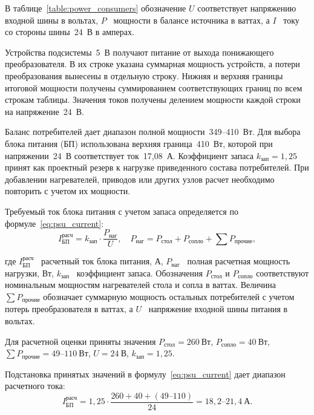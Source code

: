 В таблице~\ref{table:power_consumers} обозначение \(U\) соответствует напряжению входной шины в вольтах, \(P\)~\textemdash{} мощности в балансе источника в ваттах, а \(I\)~\textemdash{} току со стороны шины~24~В в амперах.

Устройства подсистемы~5~В получают питание от выхода понижающего преобразователя. В их строке указана суммарная мощность устройств, а потери преобразования вынесены в отдельную строку. Нижняя и верхняя границы итоговой мощности получены суммированием соответствующих границ по всем строкам таблицы. Значения токов получены делением мощности каждой строки на напряжение~24~В.

Баланс потребителей дает диапазон полной мощности~349--410~Вт. Для выбора блока питания (БП) использована верхняя граница~410~Вт, которой при напряжении~24~В соответствует ток~17,08~А. Коэффициент запаса \(k_{\text{зап}}=1{,}25\) принят как проектный резерв к нагрузке приведенного состава потребителей. При добавлении нагревателей, приводов или других узлов расчет необходимо повторить с учетом их мощности.

\begin{samepage}
Требуемый ток блока питания с учетом запаса определяется по формуле~\eqref{eq:psu_current}:
\begin{equation}
I_{\text{БП}}^{\text{расч}} =
k_{\text{зап}} \cdot \frac{P_{\text{наг}}}{U}, \quad
P_{\text{наг}} =
P_{\text{стол}} + P_{\text{сопло}} + \sum P_{\text{прочие}},
\label{eq:psu_current}
\end{equation}
\end{samepage}

\noindent где \(I_{\text{БП}}^{\text{расч}}\)~\textemdash{} расчетный ток блока питания, А, \(P_{\text{наг}}\)~\textemdash{} полная расчетная мощность нагрузки, Вт, \(k_{\text{зап}}\)~\textemdash{} коэффициент запаса. Обозначения \(P_{\text{стол}}\) и \(P_{\text{сопло}}\) соответствуют номинальным мощностям нагревателей стола и сопла в ваттах. Величина \(\sum P_{\text{прочие}}\) обозначает суммарную мощность остальных потребителей с учетом потерь преобразователя в ваттах, а \(U\)~\textemdash{} напряжение входной шины питания в вольтах.

Для расчетной оценки приняты значения \(P_{\text{стол}}=260~\text{Вт}\), \(P_{\text{сопло}}=40~\text{Вт}\), \(\sum P_{\text{прочие}}=49\text{--}110~\text{Вт}\), \(U=24~\text{В}\), \(k_{\text{зап}}=1{,}25\).
\begin{samepage}
Подстановка принятых значений в формулу~\eqref{eq:psu_current} дает диапазон расчетного тока:
\begin{equation}
I_{\text{БП}}^{\text{расч}} =
1{,}25 \cdot \frac{260 + 40 + (49\text{--}110)}{24}
= 18{,}2\text{--}21{,}4~\text{А}.
\label{eq:psu_current_range}
\end{equation}
\end{samepage}

